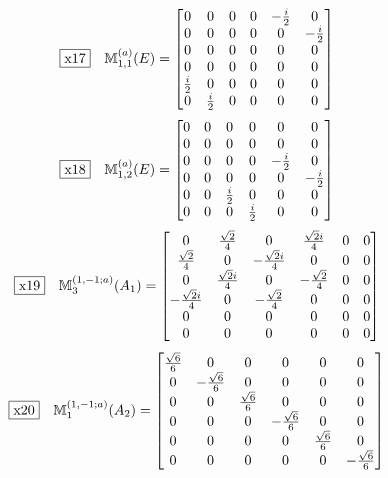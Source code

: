 \documentclass[fleqn,10pt,landscape]{jsarticle}
\begin{document}
\begin{dmath*}
\fbox{x17}\quad \mathbb{M}_{1,1}^{(a)}(E)=\begin{bmatrix} 0 & 0 & 0 & 0 & - \frac{i}{2} & 0 \\ 0 & 0 & 0 & 0 & 0 & - \frac{i}{2} \\ 0 & 0 & 0 & 0 & 0 & 0 \\ 0 & 0 & 0 & 0 & 0 & 0 \\ \frac{i}{2} & 0 & 0 & 0 & 0 & 0 \\ 0 & \frac{i}{2} & 0 & 0 & 0 & 0 \end{bmatrix}
\end{dmath*}
\begin{dmath*}
\fbox{x18}\quad \mathbb{M}_{1,2}^{(a)}(E)=\begin{bmatrix} 0 & 0 & 0 & 0 & 0 & 0 \\ 0 & 0 & 0 & 0 & 0 & 0 \\ 0 & 0 & 0 & 0 & - \frac{i}{2} & 0 \\ 0 & 0 & 0 & 0 & 0 & - \frac{i}{2} \\ 0 & 0 & \frac{i}{2} & 0 & 0 & 0 \\ 0 & 0 & 0 & \frac{i}{2} & 0 & 0 \end{bmatrix}
\end{dmath*}
\begin{dmath*}
\fbox{x19}\quad \mathbb{M}_{3}^{(1,-1;a)}(A_{1})=\begin{bmatrix} 0 & \frac{\sqrt{2}}{4} & 0 & \frac{\sqrt{2} i}{4} & 0 & 0 \\ \frac{\sqrt{2}}{4} & 0 & - \frac{\sqrt{2} i}{4} & 0 & 0 & 0 \\ 0 & \frac{\sqrt{2} i}{4} & 0 & - \frac{\sqrt{2}}{4} & 0 & 0 \\ - \frac{\sqrt{2} i}{4} & 0 & - \frac{\sqrt{2}}{4} & 0 & 0 & 0 \\ 0 & 0 & 0 & 0 & 0 & 0 \\ 0 & 0 & 0 & 0 & 0 & 0 \end{bmatrix}
\end{dmath*}
\begin{dmath*}
\fbox{x20}\quad \mathbb{M}_{1}^{(1,-1;a)}(A_{2})=\begin{bmatrix} \frac{\sqrt{6}}{6} & 0 & 0 & 0 & 0 & 0 \\ 0 & - \frac{\sqrt{6}}{6} & 0 & 0 & 0 & 0 \\ 0 & 0 & \frac{\sqrt{6}}{6} & 0 & 0 & 0 \\ 0 & 0 & 0 & - \frac{\sqrt{6}}{6} & 0 & 0 \\ 0 & 0 & 0 & 0 & \frac{\sqrt{6}}{6} & 0 \\ 0 & 0 & 0 & 0 & 0 & - \frac{\sqrt{6}}{6} \end{bmatrix}
\end{dmath*}
\end{document}
